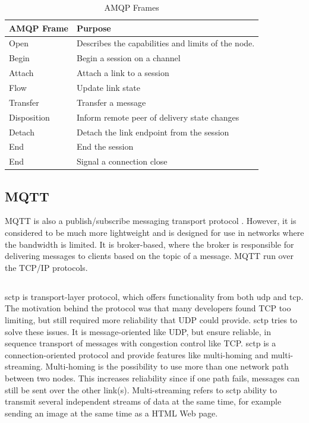\begin{table}[h]
\begin{tabularx}{\textwidth}{| X | X |}
\hline
  \textbf{AMQP Frame} & \textbf{Purpose} \\ \hline
  Open & Describes the capabilities and limits of the node. \\ \hline
  Begin & Begin a session on a channel \\ \hline
  Attach & Attach a link to a session \\ \hline
  Flow & Update link state \\ \hline
  Transfer & Transfer a message \\ \hline
  Disposition & Inform remote peer of delivery state changes \\ \hline
  Detach & Detach the link endpoint from the session \\ \hline
  End & End the session\\ \hline
  End & Signal a connection close\\ \hline
\end{tabularx}
\caption{AMQP Frames}
\label{table-amqp-frames}
\end{table}

\subsection{MQTT}

MQTT is also a publish/subscribe messaging transport protocol \cite{oasis-mqtt}.
However, it is considered to be much more lightweight and is designed for use in
networks where the bandwidth is limited. It is broker-based, where the broker is
responsible for delivering messages to clients based on the topic of a message.
MQTT run over the TCP/IP protocols.


\subsection{}

\gls{sctp} is transport-layer protocol, which offers functionality from both
\gls{udp} and \gls{tcp}\cite{rfc-sctp}. The motivation behind the protocol was
that many developers found TCP too limiting, but still required more reliability
that UDP could provide. \gls{sctp} tries to solve these issues. It is
message-oriented like UDP, but ensure reliable, in sequence transport of
messages with congestion control like TCP. \gls{sctp} is a connection-oriented
protocol and provide features like multi-homing and multi-streaming.
Multi-homing is the possibility to use more than one network path between two
nodes. This increases reliability since if one path fails, messages can still be
sent over the other link(s). Multi-streaming refers to \gls{sctp} ability to
transmit several independent streams of data at the same time, for example
sending an image at the same time as a HTML Web page.

